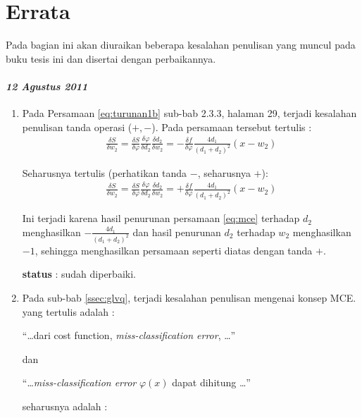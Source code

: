 \chapter*{Errata}

Pada bagian ini akan diuraikan beberapa kesalahan penulisan yang muncul
pada buku tesis ini dan disertai dengan perbaikannya.

\subsubsection*{\textit{12 Agustus 2011}}
\begin{enumerate}
	\item Pada Persamaan \ref{eq:turunan1b} sub-bab 2.3.3, halaman 29, terjadi
	kesalahan penulisan tanda operasi ($+,-$). Pada persamaan tersebut tertulis :
	\begin{align}
	\label{eq-errataN:turunan1b}
	\frac{\delta S}{\delta w_2} =  
	\frac{\delta S}{\delta \varphi} \frac{\delta \varphi}{\delta d_2} \frac{\delta
	d_2}{\delta w_2} =
	- \frac{\delta f}{\delta \varphi} \frac{4d_1}{(d_1 + d_2)^2} (x - w_2) \nonumber
	\end{align}
 
 	Seharusnya tertulis (perhatikan tanda $-$, seharusnya $+$):
 	\begin{align}
	\label{eq-errataY:turunan1b}
	\frac{\delta S}{\delta w_2} =  
	\frac{\delta S}{\delta \varphi} \frac{\delta \varphi}{\delta d_2} \frac{\delta
	d_2}{\delta w_2} =
	+ \frac{\delta f}{\delta \varphi} \frac{4d_1}{(d_1 + d_2)^2} (x - w_2) \nonumber
	\end{align}
 	
 	Ini terjadi karena hasil penurunan persamaan \ref{eq:mce} terhadap $d_2$
 	menghasilkan $-\frac{4d_1}{(d_1 + d_2)^2}$ dan hasil penurunan $d_2$ terhadap
 	$w_2$ menghasilkan $-1$, sehingga menghasilkan persamaan seperti diatas 
 	dengan tanda $+$.
 	
 	\textbf{status} : sudah diperbaiki.
 	
 	\item Pada sub-bab \ref{ssec:glvq}, terjadi kesalahan penulisan 
 	mengenai konsep MCE. yang tertulis adalah : 
 	
 	``\ldots dari cost function, \emph{miss-classification error}, \ldots''
 	
 	dan 
 	
 	``\ldots \emph{miss-classification error} $\varphi(x)$ dapat dihitung \ldots''
 	
 	seharusnya adalah :
 	

\end{enumerate}

